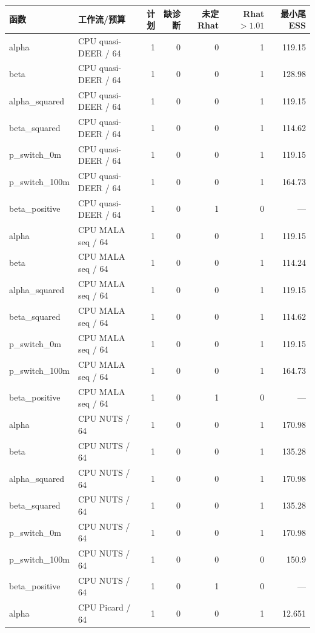 \documentclass[UTF8,fontset=fandol,a4paper]{ctexart}
\begin{document}
\begingroup\footnotesize\begin{longtable}{P{28mm}P{40mm}rrrrr}
\toprule 函数 & 工作流/预算 & 计划 & 缺诊断 & 未定Rhat & Rhat$>1.01$ & 最小尾ESS \\ \midrule\endhead
alpha & CPU quasi-DEER / 64 & 1 & 0 & 0 & 1 & 119.15 \\
beta & CPU quasi-DEER / 64 & 1 & 0 & 0 & 1 & 128.98 \\
alpha\_\allowbreak{}squared & CPU quasi-DEER / 64 & 1 & 0 & 0 & 1 & 119.15 \\
beta\_\allowbreak{}squared & CPU quasi-DEER / 64 & 1 & 0 & 0 & 1 & 114.62 \\
p\_\allowbreak{}switch\_\allowbreak{}0m & CPU quasi-DEER / 64 & 1 & 0 & 0 & 1 & 119.15 \\
p\_\allowbreak{}switch\_\allowbreak{}100m & CPU quasi-DEER / 64 & 1 & 0 & 0 & 1 & 164.73 \\
beta\_\allowbreak{}positive & CPU quasi-DEER / 64 & 1 & 0 & 1 & 0 & — \\
alpha & CPU MALA seq / 64 & 1 & 0 & 0 & 1 & 119.15 \\
beta & CPU MALA seq / 64 & 1 & 0 & 0 & 1 & 114.24 \\
alpha\_\allowbreak{}squared & CPU MALA seq / 64 & 1 & 0 & 0 & 1 & 119.15 \\
beta\_\allowbreak{}squared & CPU MALA seq / 64 & 1 & 0 & 0 & 1 & 114.62 \\
p\_\allowbreak{}switch\_\allowbreak{}0m & CPU MALA seq / 64 & 1 & 0 & 0 & 1 & 119.15 \\
p\_\allowbreak{}switch\_\allowbreak{}100m & CPU MALA seq / 64 & 1 & 0 & 0 & 1 & 164.73 \\
beta\_\allowbreak{}positive & CPU MALA seq / 64 & 1 & 0 & 1 & 0 & — \\
alpha & CPU NUTS / 64 & 1 & 0 & 0 & 1 & 170.98 \\
beta & CPU NUTS / 64 & 1 & 0 & 0 & 1 & 135.28 \\
alpha\_\allowbreak{}squared & CPU NUTS / 64 & 1 & 0 & 0 & 1 & 170.98 \\
beta\_\allowbreak{}squared & CPU NUTS / 64 & 1 & 0 & 0 & 1 & 135.28 \\
p\_\allowbreak{}switch\_\allowbreak{}0m & CPU NUTS / 64 & 1 & 0 & 0 & 1 & 170.98 \\
p\_\allowbreak{}switch\_\allowbreak{}100m & CPU NUTS / 64 & 1 & 0 & 0 & 0 & 150.9 \\
beta\_\allowbreak{}positive & CPU NUTS / 64 & 1 & 0 & 1 & 0 & — \\
alpha & CPU Picard / 64 & 1 & 0 & 0 & 1 & 12.651 \\

\end{longtable}
\end{document}

